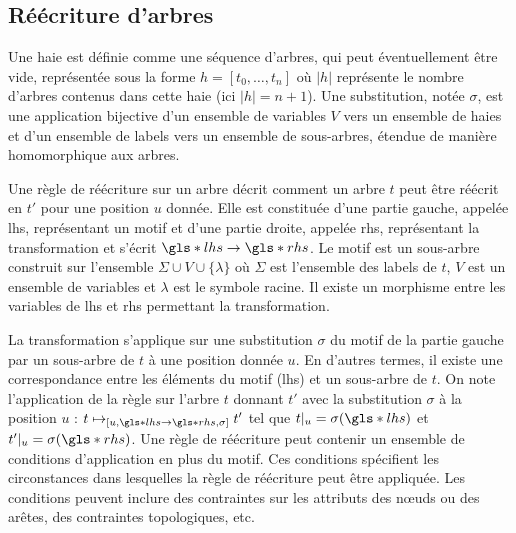 \subsection{Réécriture d'arbres}
\label{sec:struct:pre:tree-rewritting}

\begin{definition}[Haie]
    Une haie est définie comme une séquence d'arbres, qui peut éventuellement être vide, représentée sous la forme $h = [t_0, \dots , t_n]$ où $|h|$ représente le nombre d'arbres contenus dans cette haie (ici $|h| = n + 1$).
    Une substitution, notée $\sigma$, est une application bijective d'un ensemble de variables $V$ vers un ensemble de haies et d'un ensemble de labels vers un ensemble de sous-arbres, étendue de manière homomorphique aux arbres.
\end{definition}

\begin{definition}
    Une règle de réécriture sur un arbre décrit comment un arbre $t$ peut être réécrit en $t'$ pour une position $u$ donnée.
    Elle est constituée d'une partie gauche, appelée \gls{lhs}, représentant un motif et d'une partie droite, appelée \gls{rhs}, représentant la transformation et s'écrit $\gls*{lhs} \to \gls*{rhs}$.
    Le motif est un sous-arbre construit sur l'ensemble $\Sigma \cup V \cup \{\lambda\}$ où $\Sigma$ est l'ensemble des labels de $t$, $V$ est un ensemble de variables et $\lambda$ est le symbole racine.
    Il existe un morphisme entre les variables de \gls{lhs} et \gls{rhs} permettant la transformation.

    La transformation s'applique sur une substitution $\sigma$ du motif de la partie gauche par un sous-arbre de $t$ à une position donnée $u$.
    En d'autres termes, il existe une correspondance entre les éléments du motif (\gls{lhs}) et un sous-arbre de $t$.
    On note l'application de la règle sur l'arbre $t$ donnant $t'$ avec la substitution $\sigma$ à la position $u$ : $t \mapsto_{[u, \gls*{lhs} \to \gls*{rhs}, \sigma]} t'$ tel que $t|_u = \sigma(\gls*{lhs})$ et $t'|_u = \sigma(\gls*{rhs})$.
    Une règle de réécriture peut contenir un ensemble de conditions d'application en plus du motif.
    Ces conditions spécifient les circonstances dans lesquelles la règle de réécriture peut être appliquée.
    Les conditions peuvent inclure des contraintes sur les attributs des nœuds ou des arêtes, des contraintes topologiques, etc.
\end{definition}


